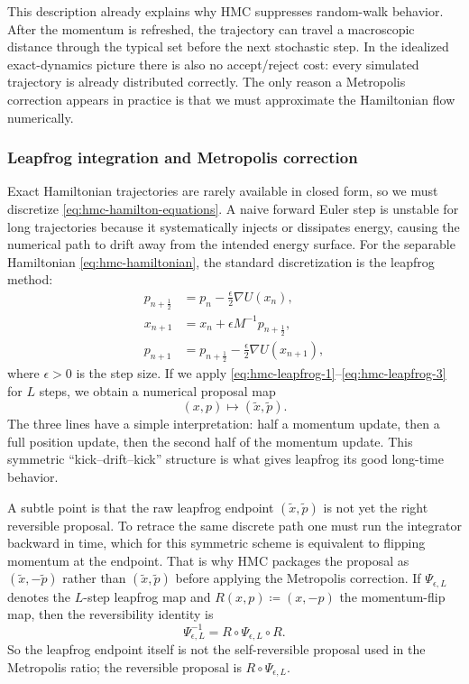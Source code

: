 This description already explains why HMC suppresses random-walk behavior.
After the momentum is refreshed, the trajectory can travel a macroscopic distance through the typical set before the next stochastic step.
In the idealized exact-dynamics picture there is also no accept/reject cost: every simulated trajectory is already distributed correctly.
The only reason a Metropolis correction appears in practice is that we must approximate the Hamiltonian flow numerically.

\subsubsection{Leapfrog integration and Metropolis correction}
\label{subsubsec:hmc-leapfrog}

Exact Hamiltonian trajectories are rarely available in closed form, so we must discretize \eqref{eq:hmc-hamilton-equations}.
A naive forward Euler step is unstable for long trajectories because it systematically injects or dissipates energy, causing the numerical path to drift away from the intended energy surface.
For the separable Hamiltonian \eqref{eq:hmc-hamiltonian}, the standard discretization is the leapfrog method:
\begin{align}
  p_{n+\frac12} &= p_n - \frac{\epsilon}{2}\nabla U(x_n),
  \label{eq:hmc-leapfrog-1}\\
  x_{n+1} &= x_n + \epsilon M^{-1}p_{n+\frac12},
  \label{eq:hmc-leapfrog-2}\\
  p_{n+1} &= p_{n+\frac12} - \frac{\epsilon}{2}\nabla U(x_{n+1}),
  \label{eq:hmc-leapfrog-3}
\end{align}
where $\epsilon>0$ is the step size.
If we apply \eqref{eq:hmc-leapfrog-1}--\eqref{eq:hmc-leapfrog-3} for $L$ steps, we obtain a numerical proposal map
\[
  (x,p) \mapsto (\tilde x,\tilde p).
\]
The three lines have a simple interpretation:
half a momentum update, then a full position update, then the second half of the momentum update.
This symmetric ``kick--drift--kick'' structure is what gives leapfrog its good long-time behavior.

A subtle point is that the raw leapfrog endpoint \((\tilde x,\tilde p)\) is not yet the right reversible proposal.
To retrace the same discrete path one must run the integrator backward in time, which for this symmetric scheme is equivalent to flipping momentum at the endpoint.
That is why HMC packages the proposal as \((\tilde x,-\tilde p)\) rather than \((\tilde x,\tilde p)\) before applying the Metropolis correction.
If \(\Psi_{\epsilon,L}\) denotes the \(L\)-step leapfrog map and \(R(x,p)\coloneqq (x,-p)\) the momentum-flip map, then the reversibility identity is
\[
  \Psi_{\epsilon,L}^{-1}=R\circ \Psi_{\epsilon,L}\circ R.
\]
So the leapfrog endpoint itself is not the self-reversible proposal used in the Metropolis ratio; the reversible proposal is \(R\circ\Psi_{\epsilon,L}\).

